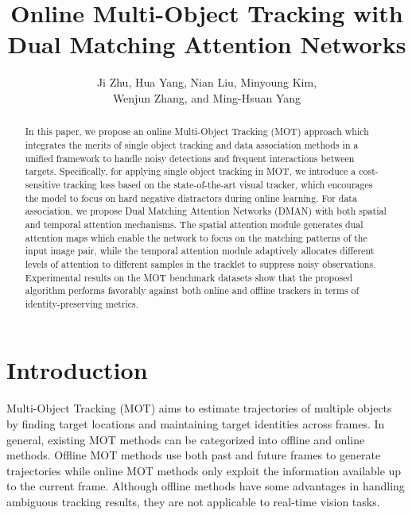\documentclass[runningheads]{llncs}
\begin{document}
\title{Online Multi-Object Tracking with\\Dual Matching Attention Networks} 
\author{Ji Zhu, Hua Yang, Nian Liu, Minyoung Kim,\\Wenjun Zhang, and Ming-Hsuan Yang}
  \maketitle              \begin{abstract}
  In this paper, we propose an online Multi-Object Tracking (MOT) approach which integrates the merits of single object tracking and data association methods in a unified framework to handle noisy detections and frequent interactions between targets. 
Specifically, for applying single object tracking in MOT, we introduce a cost-sensitive tracking loss based on the state-of-the-art visual tracker, which encourages the model to focus on hard negative distractors during online learning. 
For data association, we propose Dual Matching Attention Networks (DMAN) with both spatial and temporal attention mechanisms. 
The spatial attention module generates dual attention maps which enable the network to focus on the matching patterns of the input image pair, while the temporal attention module adaptively allocates different levels of attention to different samples in the tracklet to suppress noisy observations.
Experimental results on the MOT benchmark datasets show that the proposed algorithm performs favorably against both online and offline trackers in terms of identity-preserving metrics.
  
  \end{abstract}
\section{Introduction}
  Multi-Object Tracking (MOT) aims to estimate trajectories of multiple objects by finding target locations and maintaining target identities across frames. 
In general, existing MOT methods can be categorized into offline and online methods. 
Offline MOT methods use both past and future frames to generate trajectories while online MOT methods only exploit the information available up to the current frame. 
Although offline methods have some advantages in handling ambiguous tracking results, they are not applicable to real-time vision tasks.
  
\end{document}
